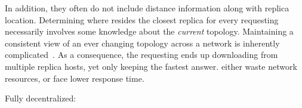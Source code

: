 \begin{asparadesc}
\noindent In addition, they often do not include distance information
along with replica location. Determining where resides the closest
replica for every requesting \process necessarily involves some
knowledge about the \emph{current} topology.  Maintaining a consistent
view of an ever changing topology across a network is inherently
complicated~\cite{topology-discovery, ospf}.
As a consequence, the requesting \node ends up downloading from multiple
replica hosts, yet only keeping the fastest answer. \Processes either
waste network resources, or face lower response time.







\item [Fully decentralized:]


\end{asparadesc}
